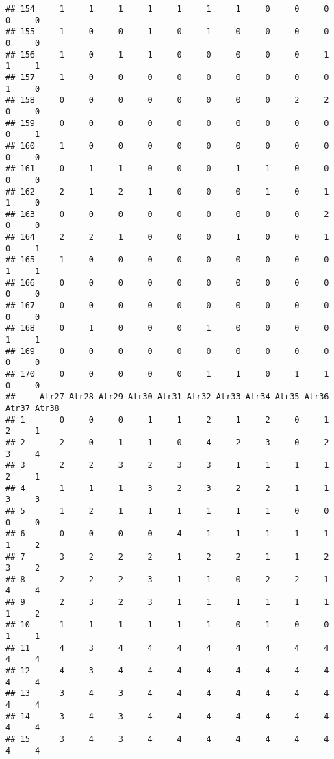 \documentclass[
]{article}
\begin{document}
\begin{verbatim}
## 154     1     1     1     1     1     1     1     0     0     0     0     0
## 155     1     0     0     1     0     1     0     0     0     0     0     0
## 156     1     0     1     1     0     0     0     0     0     1     1     1
## 157     1     0     0     0     0     0     0     0     0     0     1     0
## 158     0     0     0     0     0     0     0     0     2     2     0     0
## 159     0     0     0     0     0     0     0     0     0     0     0     1
## 160     1     0     0     0     0     0     0     0     0     0     0     0
## 161     0     1     1     0     0     0     1     1     0     0     0     0
## 162     2     1     2     1     0     0     0     1     0     1     1     0
## 163     0     0     0     0     0     0     0     0     0     2     0     0
## 164     2     2     1     0     0     0     1     0     0     1     0     1
## 165     1     0     0     0     0     0     0     0     0     0     1     1
## 166     0     0     0     0     0     0     0     0     0     0     0     0
## 167     0     0     0     0     0     0     0     0     0     0     0     0
## 168     0     1     0     0     0     1     0     0     0     0     1     1
## 169     0     0     0     0     0     0     0     0     0     0     0     0
## 170     0     0     0     0     0     1     1     0     1     1     0     0
##     Atr27 Atr28 Atr29 Atr30 Atr31 Atr32 Atr33 Atr34 Atr35 Atr36 Atr37 Atr38
## 1       0     0     0     1     1     2     1     2     0     1     2     1
## 2       2     0     1     1     0     4     2     3     0     2     3     4
## 3       2     2     3     2     3     3     1     1     1     1     2     1
## 4       1     1     1     3     2     3     2     2     1     1     3     3
## 5       1     2     1     1     1     1     1     1     0     0     0     0
## 6       0     0     0     0     4     1     1     1     1     1     1     2
## 7       3     2     2     2     1     2     2     1     1     2     3     2
## 8       2     2     2     3     1     1     0     2     2     1     4     4
## 9       2     3     2     3     1     1     1     1     1     1     1     2
## 10      1     1     1     1     1     1     0     1     0     0     1     1
## 11      4     3     4     4     4     4     4     4     4     4     4     4
## 12      4     3     4     4     4     4     4     4     4     4     4     4
## 13      3     4     3     4     4     4     4     4     4     4     4     4
## 14      3     4     3     4     4     4     4     4     4     4     4     4
## 15      3     4     3     4     4     4     4     4     4     4     4     4

\end{verbatim}
\end{document}
